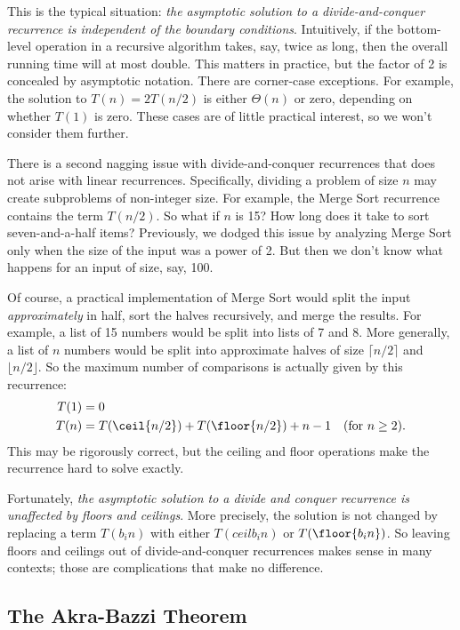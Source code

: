 This is the typical situation: \emph{the asymptotic solution to a
  divide-and-conquer recurrence is independent of the boundary
  conditions}.  Intuitively, if the bottom-level operation in a
recursive algorithm takes, say, twice as long, then the overall
running time will at most double.  This matters in practice, but the
factor of 2 is concealed by asymptotic notation.  There are
corner-case exceptions.  For example, the solution to $T(n) = 2
T(n/2)$ is either $\Theta(n)$ or zero, depending on whether $T(1)$ is
zero.  These cases are of little practical interest, so we won't
consider them further.

There is a second nagging issue with divide-and-conquer recurrences
that does not arise with linear recurrences.  Specifically, dividing
a problem of size $n$ may create subproblems of non-integer size.  For
example, the Merge Sort recurrence contains the term $T(n/2)$.  So
what if $n$ is 15?  How long does it take to sort seven-and-a-half
items?  Previously, we dodged this issue by analyzing Merge Sort only
when the size of the input was a power of 2.  But then we don't know
what happens for an input of size, say, 100.

Of course, a practical implementation of Merge Sort would split the
input \emph{approximately} in half, sort the halves recursively, and
merge the results.  For example, a list of 15 numbers would be split
into lists of 7 and 8.  More generally, a list of $n$ numbers would be
split into approximate halves of size $\lceil n / 2 \rceil$ and
$\lfloor n / 2 \rfloor$.  So the maximum number of comparisons is
actually given by this recurrence:
\begin{align*}
T(1) & = 0 \\
T(n) & = T(\ceil{n/2}) + T(\floor{n/2})+ n - 1 & \text{(for $n \geq 2$)}.
\end{align*}
This may be rigorously correct, but the ceiling and floor operations
make the recurrence hard to solve exactly.

Fortunately, \emph{the asymptotic solution to a divide and conquer
  recurrence is unaffected by floors and ceilings}.  More precisely,
the solution is not changed by replacing a term $T(b_i n)$ with either
$T(ceil{b_i n})$ or $T(\floor{b_i n})$.  So leaving
floors and ceilings out of divide-and-conquer recurrences makes sense
in many contexts; those are complications that make no difference.

\subsection{The Akra-Bazzi Theorem}

